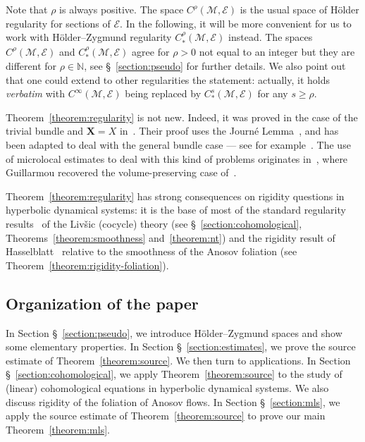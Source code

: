\documentclass[10pt]{amsart}
\theoremstyle{definition}\newtheorem{defi}[theo]{Definition}\newtheorem{rema}[theo]{Remark}\newtheorem{exam}[theo]{Example}\newtheorem{exem}[theo]{Example}\newtheorem{nota}[theo]{Notation}
\newcommand{\N}{\mathbb{N}}
\newcommand{\X}{\mathbf{X}}
\newcommand{\M}{\mathcal{M}}
\newcommand{\E}{\mathcal{E}}
\begin{document}
Note that $\rho$ is always positive. The space $C^\rho(\M,\E)$ is the usual space of H\"older regularity for sections of $\E$. In the following, it will be more convenient for us to work with H\"older--Zygmund regularity $C^\rho_*(\M,\E)$ instead. The spaces $C^\rho(\M,\E)$ and $C^\rho_*(\M,\E)$ agree for $\rho > 0$ not equal to an integer but they are different for $\rho \in \N$, see \S~\ref{section:pseudo} for further details. We also point out that one could extend to other regularities the statement: actually, it holds \emph{verbatim} with $C^\infty(\M,\E)$ being replaced by $C^s_*(\M,\E)$ for any $s \geq \rho$.

Theorem~\ref{theorem:regularity} is not new. Indeed, it was proved in the case of the trivial bundle and $\X = X$ in~\cite{DeLaLlave-Marco-Moryon-86}. Their proof uses the Journé Lemma~\cite{Journe-86}, and has been adapted to deal with the general bundle case --- see for example~\cite{Hasselblatt-92}. The use of microlocal estimates to deal with this kind of problems originates in~\cite{Guillarmou-17-1}, where Guillarmou recovered the volume-preserving case of~\cite{DeLaLlave-Marco-Moryon-86}.

Theorem~\ref{theorem:regularity} has strong consequences on rigidity questions in hyperbolic dynamical systems: it is the base of most of the standard regularity results~\cite{DeLaLlave-Marco-Moryon-86,Livsic-72,Nitica-Torok-98} of the Liv{\v s}ic (cocycle) theory (see \S~\ref{section:cohomological}, Theorems~\ref{theorem:smoothness} and~\ref{theorem:nt}) and the rigidity result of Hasselblatt~\cite{Hasselblatt-92} relative to the smoothness of the Anosov foliation (see Theorem~\ref{theorem:rigidity-foliation}).



\subsection{Organization of the paper}
In Section \S~\ref{section:pseudo}, we introduce H\"older--Zygmund spaces and show some elementary properties. In Section \S~\ref{section:estimates}, we prove the source estimate of Theorem~\ref{theorem:source}. We then turn to applications. In Section \S~\ref{section:cohomological}, we apply Theorem~\ref{theorem:source} to the study of (linear) cohomological equations in hyperbolic dynamical systems. We also discuss rigidity of the foliation of Anosov flows. In Section \S~\ref{section:mls}, we apply the source estimate of Theorem~\ref{theorem:source} to prove our main Theorem~\ref{theorem:mls}.
\end{document}
